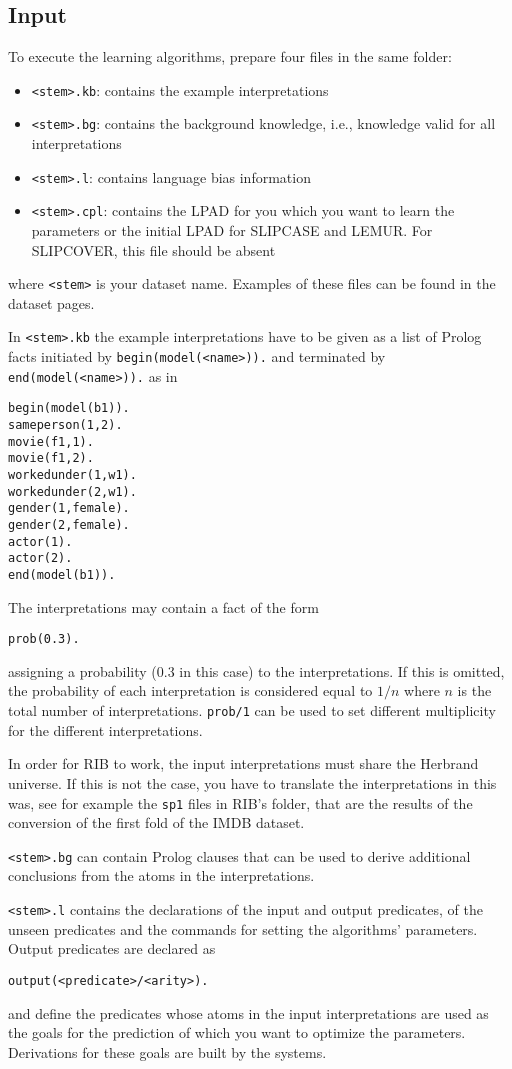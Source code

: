 \documentclass[a4paper,10pt]{scrartcl}
\begin{document}
\subsection{Input}
To execute the learning algorithms, prepare four files in the same folder: 
\begin{itemize}
\item \texttt{<stem>.kb}: contains the example interpretations 
\item \texttt{<stem>.bg}: contains the background knowledge, i.e., knowledge valid for all interpretations
\item \texttt{<stem>.l}: contains language bias information
\item \texttt{<stem>.cpl}: contains the LPAD for you which you want to learn the parameters or the initial LPAD for SLIPCASE and LEMUR. For SLIPCOVER, this file should be absent
\end{itemize}
where \texttt{<stem>} is your dataset name. Examples of these files can be found in the dataset pages.

In \texttt{<stem>.kb} the example interpretations have to be given as a list of Prolog facts initiated by 
\texttt{begin(model(<name>)).} and terminated by \texttt{end(model(<name>)).} as in
\begin{verbatim}
begin(model(b1)).
sameperson(1,2).
movie(f1,1).
movie(f1,2).
workedunder(1,w1).
workedunder(2,w1).
gender(1,female).
gender(2,female).
actor(1).
actor(2).
end(model(b1)).
\end{verbatim}
The interpretations may contain a fact of the form
\begin{verbatim}
prob(0.3).
\end{verbatim}
assigning a probability (0.3 in this case) to the interpretations. If this is omitted, the probability of each interpretation is considered equal to $1/n$ where $n$ is the total number of interpretations. \verb|prob/1| can be used to set different multiplicity for the different interpretations.

In order for RIB to work, the input interpretations must share the Herbrand universe. If this is not the case, you have to translate the interpretations in this was, see for example the \texttt{sp1} files in RIB's folder, that are the results of the conversion of the first fold of the IMDB dataset.

\texttt{<stem>.bg} can contain Prolog clauses that can be used to derive additional conclusions from the atoms in 
the interpretations.

\texttt{<stem>.l} contains the declarations of the input and output predicates, of the unseen predicates and the commands for setting the algorithms' parameters.
Output predicates are declared as
\begin{verbatim}
output(<predicate>/<arity>).
\end{verbatim}
and define the predicates whose atoms in the input interpretations are used as the goals for the prediction of which you want to optimize the parameters. Derivations for these goals are built by the systems.
\end{document}
